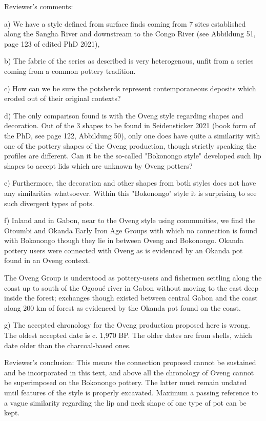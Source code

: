 \begin{reviewer}
Reviewer's comments:

a) We have a style defined from surface finds coming from 7 sites established along the Sangha River and downstream to the Congo River (see Abbildung 51, page 123 of edited PhD 2021),

b) The fabric of the series as described is very heterogenous, unfit from a series coming from a common pottery tradition.

c) How can we be sure the potsherds represent contemporaneous deposits which eroded out of their original contexts?

d) The only comparison found is with the Oveng style regarding shapes and decoration. Out of the 3 shapes to be found in Seidensticker 2021 (book form of the PhD, see page 122, Abbildung 50), only one does have quite a similarity with one of the pottery shapes of the Oveng production, though strictly speaking the profiles are different. Can it be the so-called "Bokonongo style" developed such lip shapes to accept lids which are unknown by Oveng potters?

e) Furthermore, the decoration and other shapes from both styles does not have any similarities whatsoever. Within this "Bokonongo" style it is surprising to see such divergent types of pots.

f)  Inland and in Gabon, near to the Oveng style using communities, we find the Otoumbi and Okanda Early Iron Age Groups with which no connection is found with Bokonongo though they lie in between Oveng and Bokonongo. Okanda pottery users were connected with Oveng as is evidenced by an Okanda pot found in an Oveng context.

The Oveng Group is understood as pottery-users and fishermen settling along the coast up to south of the Ogooué river in Gabon without moving to the east deep inside the forest; exchanges though existed between central Gabon and the coast along 200 km of forest as evidenced by the Okanda pot found on the coast.

g) The accepted chronology for the Oveng production proposed here is wrong. The oldest accepted date is c. 1,970 BP. The older dates are from shells, which date older than the charcoal-based ones.

Reviewer's conclusion: This means the connection proposed cannot be sustained and be incorporated in this text, and above all the chronology of Oveng cannot be superimposed on the Bokonongo pottery. The latter must remain undated until features of the style is properly excavated. Maximum a passing reference to a vague similarity regarding the lip and neck shape of one type of pot can be kept.


\end{reviewer}
